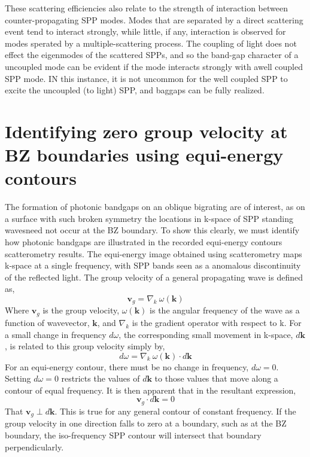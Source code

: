 \documentclass[oneside,11pt,book]{book}
\begin{document}
These scattering efficiencies also relate to the strength of interaction between counter-propagating SPP modes. Modes that are separated by a direct scattering event tend to interact strongly, while little, if any, interaction is observed for modes sperated by a multiple-scattering process.  The coupling of light does not effect the eigenmodes of the scattered SPPs, and so the band-gap character of a uncoupled mode can be evident if the mode interacts strongly with awell coupled SPP mode. IN this instance, it is not uncommon for the well coupled SPP to excite the uncoupled (to light)  SPP, and baggaps can be fully realized.

\section{Identifying zero group velocity at BZ boundaries using equi-energy contours}
The formation of photonic bandgaps on an oblique bigrating are of interest, as on a surface with such broken symmetry the locations in k-space of  SPP standing wavesneed not occur at the BZ boundary. To show this clearly, we must identify how photonic bandgaps are illustrated in the recorded equi-energy contours scatterometry results.
The equi-energy image obtained using scatterometry maps k-space at a single frequency, with SPP bands seen as a anomalous discontinuity of the reflected light. 
The group velocity of a general propagating wave is defined as,
\begin{equation}
\mathbf{v}_g = \nabla_k\: \omega(\mathbf{k})
\end{equation}
Where $\mathbf{v}_g$ is the group velocity, $\omega(\mathbf{k})$ is the angular frequency of the wave as a function of wavevector, $\mathbf{k}$, and $\nabla_k$ is the gradient operator with respect to k. For a small change in frequency $d\omega$, the corresponding small movement in k-space, $d\mathbf{k}$, is related to this group velocity simply by,
\begin{equation}
d\omega = \nabla_k\: \omega(\mathbf{k}) \cdot d\mathbf{k}
\end{equation}
For an equi-energy contour, there must be no change in frequency, $d\omega=0$. Setting $d\omega=0$ restricts the values of $d\mathbf{k}$ to those values that move along a contour of equal frequency. It is then apparent that in the resultant expression,
\begin{equation}
\mathbf{v}_g \cdot d\mathbf{k} = 0
\end{equation}
That $\mathbf{v}_g \perp d\mathbf{k}$.
This is true for any general contour of constant frequency. If the group velocity in one direction falls to zero at a boundary, such as at the BZ boundary,  the iso-frequency SPP contour will intersect that boundary perpendicularly.
\end{document}
